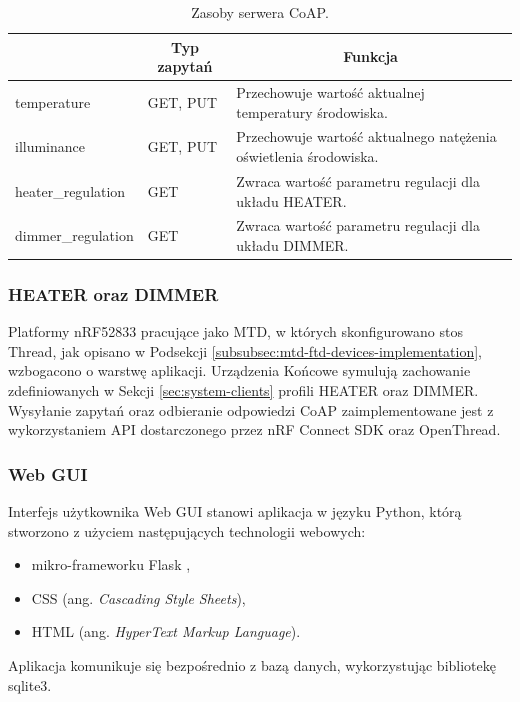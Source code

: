             \begin{table}[H]
                \centering
                \caption{Zasoby serwera CoAP.}
                \begin{tabular}{|l|l|l|}
                     \hline
                     \rowcolor{gray!20}
                     \multicolumn{1}{|c|}{Zasób} & \multicolumn{1}{c|}{Typ zapytań} & \multicolumn{1}{c|}{Funkcja} \\
                     \hline
                     temperature & GET, PUT & Przechowuje wartość aktualnej temperatury środowiska.\\
                     \hline
                     illuminance & GET, PUT & Przechowuje wartość aktualnego natężenia oświetlenia środowiska.\\
                     \hline
                     heater\_regulation & GET & Zwraca wartość parametru regulacji dla układu HEATER.\\
                     \hline
                     dimmer\_regulation & GET & Zwraca wartość parametru regulacji dla układu DIMMER.\\
                     \hline
                \end{tabular}
                \label{tab:resurces}
            \end{table}
    
        \subsubsection{HEATER oraz DIMMER}

            Platformy nRF52833 pracujące jako MTD, w których skonfigurowano stos Thread, jak opisano w Podsekcji \ref{subsubsec:mtd-ftd-devices-implementation}, wzbogacono o warstwę aplikacji. Urządzenia Końcowe symulują zachowanie zdefiniowanych w Sekcji \ref{sec:system-clients} profili HEATER oraz DIMMER. Wysyłanie zapytań oraz odbieranie odpowiedzi CoAP zaimplementowane jest z wykorzystaniem API dostarczonego przez nRF Connect SDK oraz OpenThread.
        
        \subsubsection{Web GUI}

            Interfejs użytkownika Web GUI stanowi aplikacja w języku Python, którą stworzono z użyciem następujących technologii webowych:
            \begin{itemize}
                \item mikro-frameworku Flask \cite{flask},
                \item CSS (ang. \textit{Cascading Style Sheets}),
                \item HTML (ang. \textit{HyperText Markup Language}).
            \end{itemize}
            Aplikacja komunikuje się bezpośrednio z bazą danych, wykorzystując bibliotekę sqlite3.

